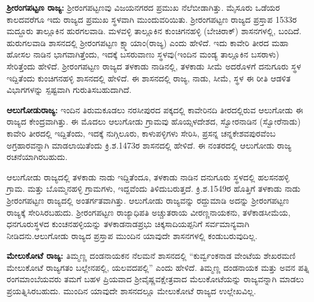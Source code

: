\textbf{ಶ‍್ರೀರಂಗಪಟ್ಟಣ ರಾಜ್ಯ:} ಶ‍್ರೀರಂಗಪಟ್ಟಣವು ವಿಜಯನಗರದ ಪ್ರಮುಖ ನೆಲೆಬೀಡಾಗಿತ್ತು. ಮೈಸೂರು ಒಡೆಯರ ಕಾಲದವರೆಗೂ ಇದು ರಾಜ್ಯದ ಪ್ರಮುಖ ಸ್ಥಳವಾಗಿ ಮುಂದುವರಿಯಿತು. ಶ‍್ರೀರಂಗಪಟ್ಟಣ ರಾಜ್ಯದ ಪ್ರಸ್ತಾಪ 1533ರ ಮದ್ದೂರು ತಾಲ್ಲೂಕಿನ ಹುರಗಲವಾಡಿ. ಮಳವಳ್ಳಿ ತಾಲ್ಲೂಕಿನ ಕುಂಚಿಗನಹಳ್ಳಿ (ಬೇಚಿರಾಕ್​) ಶಾಸನಗಳಲ್ಲಿ, ಬಂದಿದೆ. ಹುರುಗಲವಾಡಿ ಶಾಸನದಲ್ಲಿ ಶ‍್ರೀರಂಗಪಟ್ಟಣ ಕ್ಷ್ಮಾಯಾಂ(ರಾಜ್ಯ) ಎಂದು ಹೇಳಿದೆ. ಇದು ಕಾವೇರಿ ತೀರದ ಮಹಾ \hbox{ಹೋಸಲ} ನಾಡಿನ ಭಾಗವಾಗಿತ್ತೆಂದು, ಇದಕ್ಕೆ ಬಸರುವಾಣು ಸ್ಥಳವು(ಇಂದಿನ ಮಂಡ್ಯ ತಾಲ್ಲೂಕಿನ ಬಸರಾಳು) ಸೇರಿತ್ತೆಂದು ಹೇಳಿದೆ. ಶ‍್ರೀರಂಗಪಟ್ಟಣ ರಾಜ್ಯದ ತಳಕಾಡು ನಾಡಿನಲ್ಲಿ, ತಳಕಾಡು ಸೀಮೆ ಅದರೊಳಗೆ ದನುಗೂರು ಸ್ಥಳ ಇದ್ದಿತೆಂದು ಕುಂಚಿಗನಹಳ್ಳಿ ಶಾಸನದಲ್ಲಿ ಹೇಳಿದೆ. ಈ ಶಾಸನದಲ್ಲಿ ರಾಜ್ಯ, ನಾಡು, ಸೀಮೆ, ಸ್ಥಳ ಈ ರೀತಿ ಆಡಳಿತ ವಿಭಾಗಗಳನ್ನು ಸ್ಪಷ್ಟವಾಗಿ ಗುರುತಿಸಬಹುದಾಗಿದೆ.

\textbf{ಆಲುಗೋಡುರಾಜ್ಯ:} ಇಂದಿನ ತಿರುಮಕೂಡಲು ನರಸೀಪುರದ ಪಕ್ಕದಲ್ಲಿ ಕಾವೇರಿನದಿ ತೀರದಲ್ಲಿರುವ ಆಲುಗೋಡು ಈ ರಾಜ್ಯದ ಕೇಂದ್ರವಾಗಿತ್ತು. ಈ ಮೊದಲು ಆಲುಗೋಡು ಗ್ರಾಮವು ಹೊಯ್ಸಳದೇಶದ, ಸ್ವೋರನಾಡಿನ (ಸ್ವೋರೆನಾಡು) ಕಾವೇರಿ ತೀರದಲ್ಲಿ ಇದ್ದಿತೆಂದು, ಇದಕ್ಕೆ ನುಗ್ಗಿಲೂರು, ಕಾಳುಪಳ್ಳಿಗಳು ಸೇರಿಸಿ, ಪ್ರಸನ್ನ ಚನ್ನಕೇಶವಪುರವೆಂಬ ಅಗ್ರಹಾರವನ್ನಾಗಿ ಮಾಡಲಾಯಿತೆಂದು ಕ್ರಿ.ಶ.1473ರ ಶಾಸನದಲ್ಲಿ ಹೇಳಿದೆ. ಈ ನಂತರದಲ್ಲಿ ಆಲುಗೋಡು ರಾಜ್ಯ ರಚನೆಯಾಗಿರಬಹುದು.

ಆಲುಗೋಡು ರಾಜ್ಯದಲ್ಲಿ ತಳಕಾಡು ನಾಡು ಇದ್ದಿತೆಂದೂ, ತಳಕಾಡು ನಾಡಿನ ದನುಗೂರು ಸ್ಥಳದಲ್ಲಿ ಹಲಸನಹಳ್ಳಿ ಗ್ರಾಮ. ಮತ್ತು ಬೊಮ್ಮನಹಳ್ಳಿ ಗ್ರಾಮಗಳು, ಇದ್ದವೆಂದು ತಿಳಿದುಬರುತ್ತದೆ. ಕ್ರಿ.ಶ.1549ರ ಹೊತ್ತಿಗೆ ತಳಕಾಡು ನಾಡು ಶ‍್ರೀರಂಗಪಟ್ಟಣ ರಾಜ್ಯದಲ್ಲಿ ಅಂತರ್ಗತವಾಗಿತ್ತು. ಆಲುಗೋಡು ರಾಜ್ಯವನ್ನು ರದ್ದುಮಾಡಿ ಅದನ್ನು ಶ‍್ರೀರಂಗಪಟ್ಟಣ ರಾಜ್ಯಕ್ಕೆ ಸೇರಿಸಿರಬಹುದು. ಶ‍್ರೀರಂಗಪಟ್ಟಣ ರಾಜ್ಯಾಧಿಪತಿ ಅಚ್ಚುತರಾಯ ವೀರಣ್ಣನಾಯಕನು, ತಳೆಕಾಡಸೀಮೆಯ, ಧನಗೂರುಸ್ಥಳದ ಕುಂಚನಹಳ್ಳಿಯನ್ನು ತಳಕಾಡನಾಡಪ್ರಭು ಚಿಕ್ಕಸಾದಿಯಪ್ಪನಿಗೆ ಸರ್ವಮಾನ್ಯವಾಗಿ ನೀಡಿದನು.\break ಆಲುಗೋಡು ರಾಜ್ಯದ ಪ್ರಸ್ತಾಪ ಮುಂದಿನ ಯಾವುದೇ ಶಾಸನಗಳಲ್ಲಿ ಕಂಡುಬರುವುದಿಲ್ಲ.

\textbf{ಮೇಲುಕೋಟೆ ರಾಜ್ಯ:} ತಿಮ್ಮಣ್ಣ ದಂಡನಾಯಕನ ನೆಲಮನೆ ಶಾಸನದಲ್ಲಿ “ಕುರ್ವ್ವಂಕನಾಡ ವೇಂಟೆಯ ಶೇಖರಮಣಿ ಮೇಲುಕೋಟೆ ರಾಜ್ಯಗತಂ ಬಲ್ಲೇನಪಲ್ಲಿ, ಯಲವದಪಲ್ಲಿ” ಎಂದು ಹೇಳಿದೆ. ತಿಮ್ಮಣ್ಣ ದಂಡನಾಯಕ ಮತ್ತು ಅವನ ಪತ್ನಿ ರಂಗಮಾಂಬೆಯವರು ತಮಗೆ ಬಹಳ ಪ್ರಿಯವಾದ ಶ‍್ರೀವೈಷ್ಣವಕ್ಷೇತ್ರವಾದ ಮೆಲುಕೋಟೆಯನ್ನು ರಾಜ್ಯವನ್ನಾಗಿ ಮಾಡಲು ಪ್ರಯತ್ನಿಸಿರಬಹುದು. ಮುಂದಿನ ಯಾವುದೇ ಶಾಸನದಲ್ಲೂ ಮೇಲುಕೋಟೆ ರಾಜ್ಯದ ಉಲ್ಲೇಖವಿಲ್ಲ.



